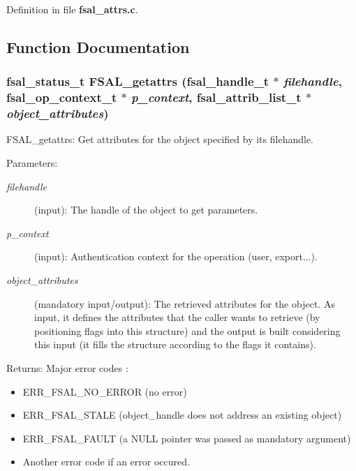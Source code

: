 Definition in file {\bf fsal\_\-attrs.c}.

\subsection{Function Documentation}
\subsubsection[{FSAL\_\-getattrs}]{\setlength{\rightskip}{0pt plus 5cm}fsal\_\-status\_\-t FSAL\_\-getattrs (fsal\_\-handle\_\-t $\ast$ {\em filehandle}, \/  fsal\_\-op\_\-context\_\-t $\ast$ {\em p\_\-context}, \/  fsal\_\-attrib\_\-list\_\-t $\ast$ {\em object\_\-attributes})}\label{fsal__attrs_8c_1a28c6ab788c37b4658aeb6ed9536d7b}


FSAL\_\-getattrs: Get attributes for the object specified by its filehandle.

\begin{Desc}
\item[Parameters:]
\begin{description}
\item[{\em filehandle}](input): The handle of the object to get parameters. \item[{\em p\_\-context}](input): Authentication context for the operation (user, export...). \item[{\em object\_\-attributes}](mandatory input/output): The retrieved attributes for the object. As input, it defines the attributes that the caller wants to retrieve (by positioning flags into this structure) and the output is built considering this input (it fills the structure according to the flags it contains).\end{description}
\end{Desc}
\begin{Desc}
\item[Returns:]Major error codes :\begin{itemize}
\item ERR\_\-FSAL\_\-NO\_\-ERROR (no error)\item ERR\_\-FSAL\_\-STALE (object\_\-handle does not address an existing object)\item ERR\_\-FSAL\_\-FAULT (a NULL pointer was passed as mandatory argument)\item Another error code if an error occured. \end{itemize}
\end{Desc}


